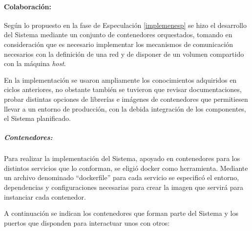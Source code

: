 \documentclass[
  12pt,
  openany]{book}
\begin{document}
\hypertarget{implemencolab}{%
\paragraph{Colaboración:}\label{implemencolab}}

Según lo propuesto en la fase de Especulación \ref{implemenesp} se hizo el desarrollo del Sistema mediante un conjunto de contenedores orquestados, tomando en consideración que es necesario implementar los mecanismos de comunicación necesarios con la definición de una red y de disponer de un volumen compartido con la máquina \emph{host}.

En la implementación se usaron ampliamente los conocimientos adquiridos en ciclos anteriores, no obstante también se tuvieron que revisar documentaciones, probar distintas opciones de librerías e imágenes de contenedores que permitiesen llevar a un entorno de producción, con la debida integración de los componentes, el Sistema planificado.

\hypertarget{contenedores-1}{%
\subparagraph{Contenedores:}\label{contenedores-1}}

Para realizar la implementación del Sistema, apoyado en contenedores para los distintos servicios que lo conforman, se eligió docker como herramienta. Mediante un archivo denominado ``dockerfile'' para cada servicio se especificó el entorno, dependencias y configuraciones necesarias para crear la imagen que servirá para instanciar cada contenedor.

A continuación se indican los contenedores que forman parte del Sistema y los puertos que disponden para interactuar unos con otros:
\end{document}
